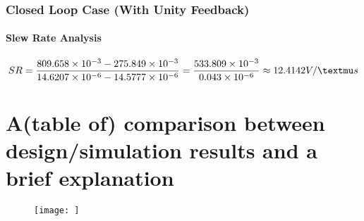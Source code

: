 \subsubsection{Closed Loop Case (With Unity Feedback)}
\paragraph{Slew Rate Analysis}
\begin{equation*}
    SR = \frac{809.658 \times 10^{-3} - 275.849 \times 10^{-3}}{14.6207 \times 10^{-6} - 14.5777 \times 10^{-6}} = \frac{533.809 \times 10^{-3}}{0.043 \times 10^{-6}} \approx 12.4142 V/\textmu s
\end{equation*}


\section{ A(table of) comparison between design/simulation results and a brief explanation}



















    \begin{figure}[h]
        \centering
           \texttt{[image: ]}
        \caption{}
        \label{fig: }
    \end{figure}

\endinput